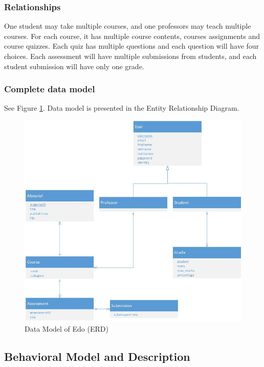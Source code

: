 \documentclass[paper=a4, fontsize=11pt]{scrartcl}
\numberwithin{equation}{section}		%
\numberwithin{figure}{section}			%
\numberwithin{table}{section}				%
\begin{document}
\subsubsection{Relationships}
One student may take multiple courses, and one professors may teach multiple courses. For each course, it has multiple course contents, courses assignments and course quizzes. Each quiz has multiple questions and each question will have four choices. Each assessment will have multiple submissions from students, and each student submission will have only one grade. 

\subsubsection{Complete data model}
See Figure \ref{data}. Data model is presented in the Entity Relationship Diagram.
\begin{figure}[!ht]
	\begin{center}
		\includegraphics[width=\textwidth,height=\textheight,keepaspectratio]{ERD}
	\end{center}
	\caption{Data Model of Edo (ERD)}
	\label{data}
\end{figure}


\subsection{Behavioral Model and Description}
\end{document}
